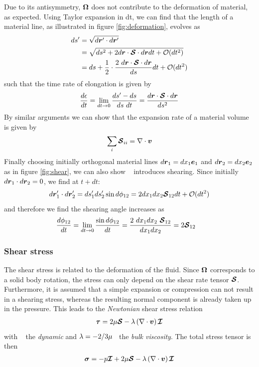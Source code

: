 Due to its antisymmetry, $\boldsymbol {\Omega}$ does not contribute to the
deformation of material, as expected. Using Taylor expansion in dt, we
can find that the length of a material line, as illustrated in figure
\ref{fig:deformation}, evolves as
\begin{align*}
  ds^{\prime}
  &= \sqrt{d\boldsymbol {r}^\prime \cdot d\boldsymbol {r}^\prime} \\
  &= \sqrt{ds^2 + 2 d\boldsymbol {r} \cdot \boldsymbol {\boldsymbol {\mathcal S}} \cdot d\boldsymbol {r} dt + \mathcal O(dt^2)} \\ 
  &= ds + \frac{1}{2} \cdot \frac{2 ~d\boldsymbol {r} \cdot \boldsymbol {\boldsymbol {\mathcal S}} \cdot d\boldsymbol {r}}{ds} dt + \mathcal O(dt^2)
\end{align*}
such that the time rate of elongation is given by
\begin{equation*}
  \frac{d\epsilon}{dt} = \lim_{dt \rightarrow 0} \frac{ds^\prime - ds}{ds~ dt} = \frac{d\boldsymbol {r} \cdot \boldsymbol {\boldsymbol {\mathcal S}} \cdot d\boldsymbol {r}}{ds^2}
\end{equation*}
By similar arguments we can show that the expansion rate of a material
volume is given by 
\begin{align*}
  \sum_i \boldsymbol {\mathcal S}_{ii} = \nabla \cdot \boldsymbol {v}
\end{align*}
Finally choosing initially orthogonal material lines $d\boldsymbol {r}_1 = dx_1
\boldsymbol e_{1}$ and $d\boldsymbol {r}_2 = dx_2 \boldsymbol e_{2}$ as in figure
\ref{fig:shear}, we can also show \shearRateT~ introduces
shearing. Since initially $d\boldsymbol {r}_1 \cdot d\boldsymbol {r}_2 = 0$, we find at
$t+dt$:
\begin{align*}
  d\boldsymbol {r}_1^\prime \cdot d\boldsymbol {r}_2^\prime = ds_1^\prime ds_2^\prime \sin
  d \phi_{12} = 2 dx_1 dx_2 \boldsymbol {\mathcal S}_{12} dt + \mathcal O(dt^2)
\end{align*}
and therefore we find the shearing angle increases as
\begin{align*}
  \frac{d\phi_{12}}{dt} &= \lim_{dt \rightarrow 0}  \frac{\sin{d\phi_{12}}}{dt} 
  = \frac{2 ~dx_1 dx_2~\boldsymbol {\mathcal S}_{12}}{dx_1 dx_2}   = 2 \boldsymbol {\mathcal S}_{12}
\end{align*}

\subsubsection{Shear stress}

The shear stress is related to the deformation of the fluid. Since
$\boldsymbol {\Omega}$ corresponds to a solid body rotation, the stress can only
depend on the shear rate tensor $\boldsymbol {\boldsymbol {\mathcal S}}$. Furthermore, it is
assumed that a simple expansion or compression can not result in a
shearing stress, whereas the resulting normal component is already
taken up in the pressure. This leads to the \emph{Newtonian} shear
stress relation
\begin{align*}
  \boldsymbol {\tau} = 2 \mu \boldsymbol {\boldsymbol {\mathcal S}} - \lambda \left(\nabla \cdot \boldsymbol {v}\right) \boldsymbol {\mathcal I}
\end{align*}
with \dynVisc~ the \emph{dynamic} and $\lambda = - 2/3 \mu$~
the \emph{bulk viscosity}. The total stress tensor is then
\begin{align*}
  \boldsymbol {\sigma} = - p \boldsymbol {\mathcal I} + 2 \mu \boldsymbol {\boldsymbol {\mathcal S}} - \lambda \left(\nabla \cdot \boldsymbol {v}\right) \boldsymbol {\mathcal I}
\end{align*}

